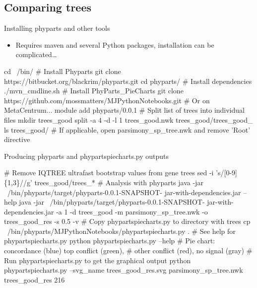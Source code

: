 \documentclass[compress, ucs, xelatex, 11pt, xcolor=x11names, aspectratio=169,
	hyperref={
		bookmarks=true,
		unicode=true,
		colorlinks=true,
		pdftitle={HybSeq course},
		plainpages=false,
		pdfauthor={Vojtech Zeisek},
		pdfsubject={Practical processing of HybSeq target enrichment sequencing data on computing grids like MetaCentrum},
		pdfcreator={XeLaTeX},
		pdfkeywords={BASH, command line, GNU, HybSeq, Linux, MetaCentrum, sequencing shell, target enrichment},
		linkcolor=Turquoise4, %
		anchorcolor=DodgerBlue4, %
		citecolor=DodgerBlue4, %
		filecolor=DodgerBlue4, %
		menucolor=Tan4, %
		urlcolor=DarkOliveGreen4, %
		pdftex},
	url={hyphens, lowtilde} %
	]{beamer}
\renewcommand{\texttt}[1]{\colorbox{Cornsilk2}{{\ttfamily #1}}}
\begin{document}
\subsection{Comparing trees}

\begin{frame}[fragile]{Installing phyparts and other tools}
	\begin{itemize}
		\item Requires \texttt{maven} and several Python packages, installation can be complicated\ldots
	\end{itemize}
	\begin{bashcode}
    cd ~/bin/
    # Install Phyparts
    git clone https://bitbucket.org/blackrim/phyparts.git
    cd phyparts/
    # Install dependencies
    ./mvn_cmdline.sh
    # Install PhyParts_PieCharts
    git clone https://github.com/mossmatters/MJPythonNotebooks.git
    # Or on MetaCentrum...
    module add phyparts/0.0.1
    # Split list of trees into individual files
    mkdir trees_good
    split -a 4 -d -l 1 trees_good.nwk trees_good/trees_good_
    ls trees_good/
    # If applicable, open parsimony_sp_tree.nwk and remove 'Root' directive
	\end{bashcode}
\end{frame}

\begin{frame}[fragile]{Producing phyparts and phypartspiecharts.py outputs}
	\begin{bashcode}
    # Remove IQTREE ultrafast bootstrap values from gene trees
    sed -i 's/\/[0-9]\{1,3\}//g' trees_good/trees_*
    # Analysis with phyparts
    java -jar ~/bin/phyparts/target/phyparts-0.0.1-SNAPSHOT-
      jar-with-dependencies.jar --help
    java -jar ~/bin/phyparts/target/phyparts-0.0.1-SNAPSHOT-
      jar-with-dependencies.jar -a 1 -d trees_good -m
      parsimony_sp_tree.nwk -o trees_good_res -s 0.5 -v
    # Copy phypartspiecharts.py to directory with trees
    cp ~/bin/phyparts/MJPythonNotebooks/phypartspiecharts.py .
    # See help for phypartspiecharts.py
    python phypartspiecharts.py --help
    # Pie chart: concordance (blue) top conflict (green),
    # other conflict (red), no signal (gray)
    # Run phypartspiecharts.py to get the graphical output
    python phypartspiecharts.py --svg_name trees_good_res.svg
      parsimony_sp_tree.nwk trees_good_res 216
	\end{bashcode}
\end{frame}
\end{document}
